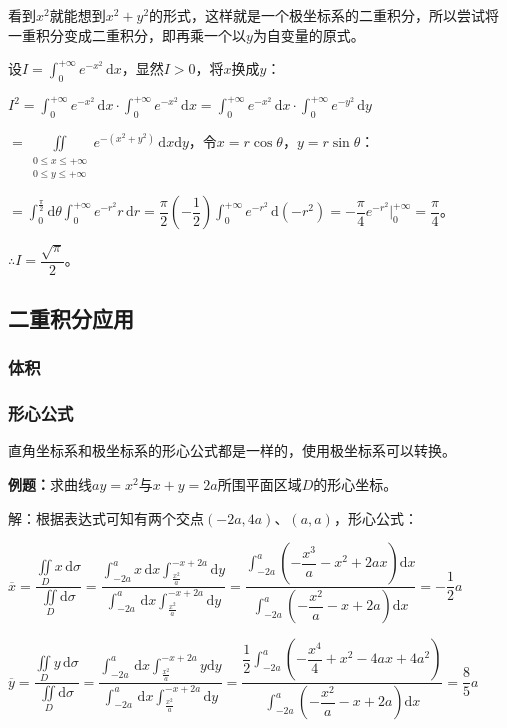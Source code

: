 \documentclass[UTF8, 12pt]{ctexart}
\begin{document}
看到$x^2$就能想到$x^2+y^2$的形式，这样就是一个极坐标系的二重积分，所以尝试将一重积分变成二重积分，即再乘一个以$y$为自变量的原式。

设$I=\int_0^{+\infty}e^{-x^2}\,\textrm{d}x$，显然$I>0$，将$x$换成$y$：

$I^2=\int_0^{+\infty}e^{-x^2}\,\textrm{d}x\cdot\int_0^{+\infty}e^{-x^2}\,\textrm{d}x=\int_0^{+\infty}e^{-x^2}\,\textrm{d}x\cdot\int_0^{+\infty}e^{-y^2}\,\textrm{d}y$

$=\displaystyle{\iint\limits_{\substack{0\leqslant x\leqslant+\infty\\0\leqslant y\leqslant+\infty}}e^{-(x^2+y^2)}\,\textrm{d}x\textrm{d}y}$，令$x=r\cos\theta$，$y=r\sin\theta$：

$=\displaystyle{\int_0^\frac{\pi}{2}\textrm{d}\theta\int_0^{+\infty}e^{-r^2}r\,\textrm{d}r=\dfrac{\pi}{2}\left(-\dfrac{1}{2}\right)\int_0^{+\infty}e^{-r^2}\,\textrm{d}(-r^2)=-\dfrac{\pi}{4}e^{-r^2}\bigg\vert_0^{+\infty}}=\dfrac{\pi}{4}$。

$\therefore I=\dfrac{\sqrt{\pi}}{2}$。

\subsection{二重积分应用}

\subsubsection{体积}

\subsubsection{形心公式}

直角坐标系和极坐标系的形心公式都是一样的，使用极坐标系可以转换。

\textbf{例题：}求曲线$ay=x^2$与$x+y=2a$所围平面区域$D$的形心坐标。

解：根据表达式可知有两个交点$(-2a,4a)$、$(a,a)$，形心公式：

$\overline{x}=\dfrac{\iint\limits_Dx\,\textrm{d}\sigma}{\iint\limits_D\textrm{d}\sigma}=\dfrac{\int_{-2a}^ax\,\textrm{d}x\int_{\frac{x^2}{a}}^{-x+2a}\textrm{d}y}{\int_{-2a}^a\,\textrm{d}x\int_{\frac{x^2}{a}}^{-x+2a}\textrm{d}y}=\dfrac{\int_{-2a}^a(-\dfrac{x^3}{a}-x^2+2ax)\textrm{d}x}{\int_{-2a}^a(-\dfrac{x^2}{a}-x+2a)\textrm{d}x}=-\dfrac{1}{2}a$

$\overline{y}=\dfrac{\iint\limits_Dy\,\textrm{d}\sigma}{\iint\limits_D\textrm{d}\sigma}=\dfrac{\int_{-2a}^a\,\textrm{d}x\int_{\frac{x^2}{a}}^{-x+2a}y\textrm{d}y}{\int_{-2a}^a\,\textrm{d}x\int_{\frac{x^2}{a}}^{-x+2a}\textrm{d}y}=\dfrac{\dfrac{1}{2}\int_{-2a}^a(-\dfrac{x^4}{4}+x^2-4ax+4a^2)}{\int_{-2a}^a(-\dfrac{x^2}{a}-x+2a)\textrm{d}x}=\dfrac{8}{5}a$
\end{document}

